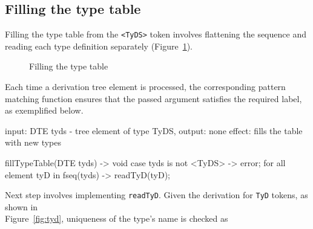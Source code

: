 \subsection{Filling the type table}\label{subsec:filling-the-type-table}
Filling the type table from the \verb+<TyDS>+ token involves flattening the sequence and reading each
type definition separately (Figure~\ref{fig:fill_tt}).
\begin{figure}[h]
    \centering
    \caption{Filling the type table}
    \label{fig:fill_tt}
\end{figure}
\newpage
Each time a derivation tree element is processed, the corresponding pattern matching function ensures
that the passed argument satisfies the required label, as exemplified below.
\begin{codeblock}
    input: DTE tyds - tree element of type TyDS,
    output: none
    effect: fills the table with new types

    fillTypeTable(DTE tyds) -> void {
        case tyds is not <TyDS> -> error;
        for all element tyD in fseq(tyds) -> readTyD(tyD);
    }
\end{codeblock}
Next step involves implementing \verb+readTyD+.
Given the derivation for \verb+TyD+ tokens, as shown in\\ Figure~\ref{fig:tyd}, uniqueness of the type's name is checked as

